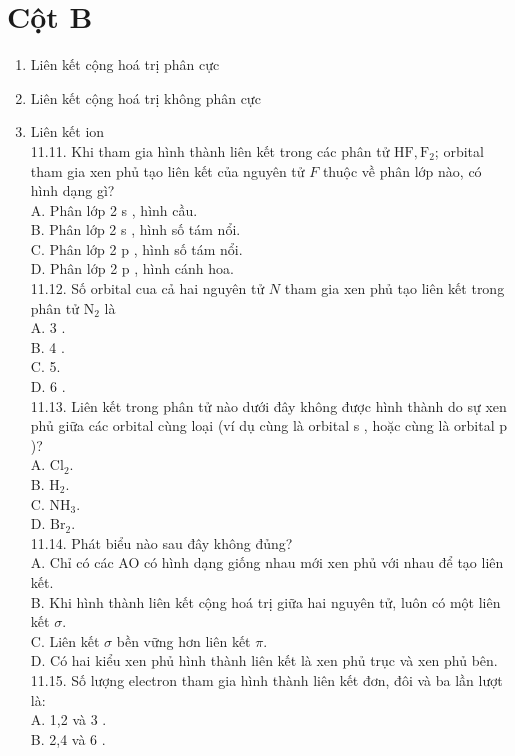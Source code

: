 \documentclass[10pt]{article}
\begin{document}
\section*{Cột B}
\begin{enumerate}
  \item Liên kết cộng hoá trị phân cực
  \item Liên kết cộng hoá trị không phân cực
  \item Liên kết ion\\
11.11. Khi tham gia hình thành liên kết trong các phân tử $\mathrm{HF}, \mathrm{F}_{2}$; orbital tham gia xen phủ tạo liên kết của nguyên tử $F$ thuộc về phân lớp nào, có hình dạng gì?\\
A. Phân lớp 2 s , hình cầu.\\
B. Phân lớp 2 s , hình số tám nổi.\\
C. Phân lớp 2 p , hình số tám nổi.\\
D. Phân lớp 2 p , hình cánh hoa.\\
11.12. Số orbital cua cả hai nguyên tử $N$ tham gia xen phủ tạo liên kết trong phân tử $\mathrm{N}_{2}$ là\\
A. 3 .\\
B. 4 .\\
C. 5.\\
D. 6 .\\
11.13. Liên kết trong phân tử nào dưới đây không được hình thành do sự xen phủ giữa các orbital cùng loại (ví dụ cùng là orbital s , hoặc cùng là orbital p )?\\
A. $\mathrm{Cl}_{2}$.\\
B. $\mathrm{H}_{2}$.\\
C. $\mathrm{NH}_{3}$.\\
D. $\mathrm{Br}_{2}$.\\
11.14. Phát biểu nào sau đây không đủng?\\
A. Chỉ có các AO có hình dạng giống nhau mới xen phủ với nhau để tạo liên kết.\\
B. Khi hình thành liên kết cộng hoá trị giữa hai nguyên tử, luôn có một liên kết $\sigma$.\\
C. Liên kết $\sigma$ bền vững hơn liên kết $\pi$.\\
D. Có hai kiểu xen phủ hình thành liên kết là xen phủ trục và xen phủ bên.\\
11.15. Số lượng electron tham gia hình thành liên kết đơn, đôi và ba lần lượt là:\\
A. 1,2 và 3 .\\
B. 2,4 và 6 .\\

\end{enumerate}
\end{document}
